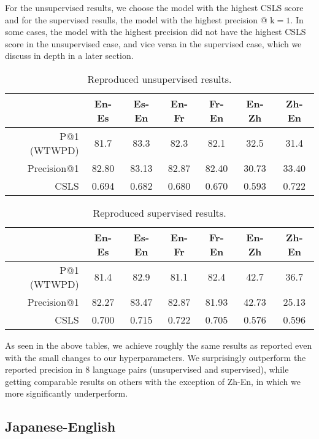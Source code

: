\documentclass{article}
\begin{document}
For the unsupervised results, we choose the model with the highest CSLS score
and for the supervised resulls, the model with the highest precision @
$\text{k}=1$. In some cases, the model with the highest precision did not have
the highest CSLS score in the unsupervised case, and vice versa in the supervised
case, which we discuss in depth in a later section.

\begin{table}[h]
  \centering
  \begin{tabular}{||r|cc|cc|cc||}
    \hline
    & En-Es & Es-En & En-Fr & Fr-En & En-Zh & Zh-En \\
    \hline
    P@1 (WTWPD) & 81.7  & 83.3  & 82.3  & 82.1  & 32.5  & 31.4  \\
    \hline
    Precision@1 & 82.80 & 83.13 & 82.87 & 82.40 & 30.73 & 33.40 \\
    CSLS        & 0.694 & 0.682 & 0.680 & 0.670 & 0.593 & 0.722 \\
    \hline
  \end{tabular}
  \caption{Reproduced unsupervised results.}
\end{table}

\begin{table}[h]
  \centering
  \begin{tabular}{||r|cc|cc|cc||}
    \hline
    & En-Es & Es-En & En-Fr & Fr-En & En-Zh & Zh-En \\
    \hline
    P@1 (WTWPD) & 81.4  & 82.9  & 81.1  & 82.4  & 42.7  & 36.7  \\
    \hline
    Precision@1 & 82.27 & 83.47 & 82.87 & 81.93 & 42.73 & 25.13 \\
    CSLS        & 0.700 & 0.715 & 0.722 & 0.705 & 0.576 & 0.596 \\
    \hline
  \end{tabular}
  \caption{Reproduced supervised results.}
\end{table}

As seen in the above tables, we achieve roughly the same results as reported even
with the small changes to our hyperparameters. We surprisingly outperform the
reported precision in 8 language pairs (unsupervised and supervised), while getting
comparable results on others with the exception of Zh-En, in which we more 
significantly underperform.

\subsection*{Japanese-English}
\end{document}
